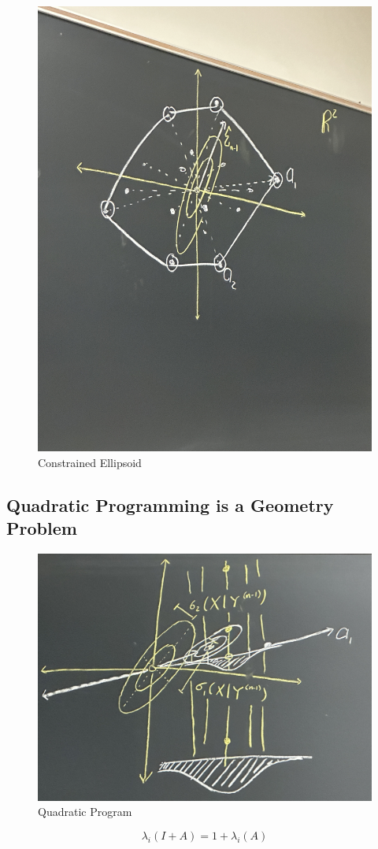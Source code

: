 \begin{figure}[H]
    \centering
    \includegraphics[scale=0.1]{lectures/wk10/img/constrainedEllipsoid.jpeg}
    \caption{Constrained Ellipsoid}
    \label{fig:constrained-ellipsoid}
\end{figure}

\subsection{Quadratic Programming is a Geometry Problem}
\begin{figure}[H]
    \centering
    \includegraphics[scale=0.1]{lectures/wk10/img/QP.jpeg}
    \caption{Quadratic Program}
    \label{fig:quadratic-rogram}
\end{figure}
$$
\lambda_i(I+A)=1+\lambda_i(A)
$$

